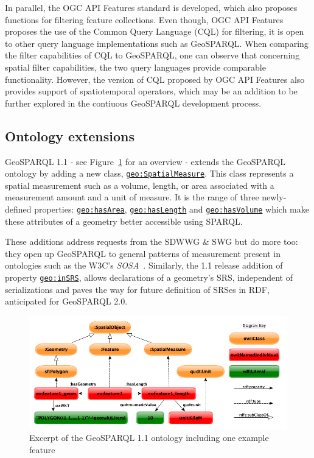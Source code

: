 \documentclass[runningheads]{llncs}
\begin{document}
In parallel, the OGC API Features standard \cite{ogcapifeaturespart3} is developed, which also proposes functions for filtering feature collections. Even though, OGC API Features proposes the use of the Common Query Language (CQL) for filtering, it is open to other query language implementations such as GeoSPARQL. When comparing the filter capabilities of CQL to GeoSPARQL, one can observe that concerning spatial filter capabilities, the two query languages provide comparable functionality. However, the version of CQL proposed by OGC API Features also provides support of spatiotemporal operators, which may be an addition to be further explored in the contiuous GeoSPARQL development process.

\subsection{Ontology extensions}\label{sec:ontexts}
GeoSPARQL 1.1 - see Figure~\ref{fig:geosparql11ontology} for an overview - extends the GeoSPARQL ontology by adding a new class, \href{http://www.opengis.net/ont/geosparql#SpatialMeasure}{\texttt{geo:SpatialMeasure}}. This class represents a spatial measurement 
such as a volume, length, or area associated with a measurement amount and a unit of measure. It is the range of three newly-defined properties:
\href{http://www.opengis.net/ont/geosparql#hasArea}{\texttt{geo:hasArea}}, \href{http://www.opengis.net/ont/geosparql#hasLength}{\texttt{geo:hasLength}} and \href{http://www.opengis.net/ont/geosparql#hasVolume}{\texttt{geo:hasVolume}} which make these attributes of a geometry better accessible using 
SPARQL. 

These additions address requests from the SDWWG \& SWG but
do more too: they open up GeoSPARQL to general patterns of measurement present in ontologies 
such as the W3C's \textit{SOSA}~\cite{haller_semantic_2017}. Similarly, 
the 1.1 release addition of property \href{http://www.opengis.net/def/function/geosparql/inSRS}{\texttt{geo:inSRS}}, allows declarations of a geometry's SRS, independent of serializations and paves the way 
for future definition of SRSes in RDF, anticipated for GeoSPARQL 2.0.

\begin{figure}[htb]
    \centering
    \includegraphics[width=\linewidth]{images/geold_ontology.png}
    \caption{Excerpt of the GeoSPARQL 1.1 ontology including one example feature}
    \label{fig:geosparql11ontology}
\end{figure}
\end{document}
